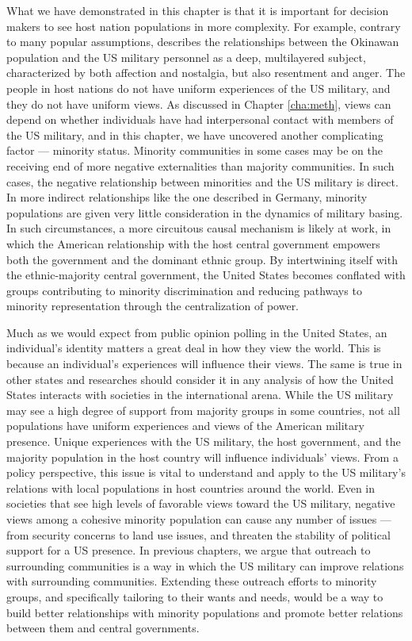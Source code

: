 What we have demonstrated in this chapter is that it is important for decision makers to see host nation populations in more complexity. For example, contrary to many popular assumptions,  describes the relationships between the Okinawan population and the US military personnel as a deep, multilayered subject, characterized by both affection and nostalgia, but also resentment and anger. The people in host nations do not have uniform experiences of the US military, and they do not have uniform views. As discussed in Chapter \ref{cha:meth}, views can depend on whether individuals have had interpersonal contact with members of the US military, and in this chapter, we have uncovered another complicating factor --- minority status. Minority communities in some cases may be on the receiving end of more negative externalities than majority communities. In such cases, the negative relationship between minorities and the US military is direct. In more indirect relationships like the one described in Germany, minority populations are given very little consideration in the dynamics of military basing. In such circumstances, a more circuitous causal mechanism is likely at work, in which the American relationship with the host central government empowers both the government and the dominant ethnic group. By intertwining itself with the ethnic-majority central government, the United States becomes conflated with groups contributing to minority discrimination and reducing pathways to minority representation through the centralization of power. 

Much as we would expect from public opinion polling in the United States, an individual's identity matters a great deal in how they view the world. This is because an individual's experiences will influence their views. The same is true in other states and researches should consider it in any analysis of how the United States interacts with societies in the international arena. While the US military may see a high degree of support from majority groups in some countries, not all populations have uniform experiences and views of the American military presence. Unique experiences with the US military, the host government, and the majority population in the host country will influence individuals' views. From a policy perspective, this issue is vital  to understand and apply to the US military's relations with local populations in host countries around the world. Even in societies that see high levels of favorable views toward the US military, negative views among a cohesive minority population can cause any number of issues --- from security concerns to land use issues, and threaten the stability of political support for a US presence. In previous chapters, we argue that outreach to surrounding communities is a way in which the US military can improve relations with surrounding communities. Extending these outreach efforts to minority groups, and specifically tailoring to their wants and needs, would be a way to build better relationships with minority populations and promote better relations between them and central governments.  

